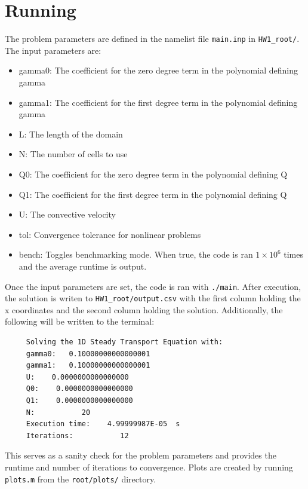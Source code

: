 \documentclass[reqno, 12pt]{article}
\begin{document}
    \section*{Running}
    The problem parameters are defined in the namelist file \texttt{main.inp} in \texttt{HW1\_root/}.
    The input parameters are:
    \begin{itemize}
        \setlength\itemsep{-0.25em}
        \item gamma0: The coefficient for the zero degree term in the polynomial defining gamma
        \item gamma1: The coefficient for the first degree term in the polynomial defining gamma
        \item L: The length of the domain
        \item N: The number of cells to use
        \item Q0: The coefficient for the zero degree term in the polynomial defining Q
        \item Q1: The coefficient for the first degree term in the polynomial defining Q
        \item U: The convective velocity
        \item tol: Convergence tolerance for nonlinear problems
        \item bench: Toggles benchmarking mode. When true, the code is ran $1\times 10^6$ times and the average runtime is output.
    \end{itemize}
    Once the input parameters are set, the code is ran with \texttt{./main}.
    After execution, the solution is writen to \texttt{HW1\_root/output.csv} with the first column holding the x coordinates and the second column holding the solution.
    Additionally, the following will be written to the terminal:
    \begin{verbatim}
     Solving the 1D Steady Transport Equation with:
     gamma0:   0.10000000000000001
     gamma1:   0.10000000000000001
     U:    0.0000000000000000
     Q0:    0.0000000000000000
     Q1:    0.0000000000000000
     N:           20
     Execution time:    4.99999987E-05  s
     Iterations:           12
    \end{verbatim}
    \vspace{-0.25in}
    This serves as a sanity check for the problem parameters and provides the runtime and number of iterations to convergence.
    Plots are created by running \texttt{plots.m} from the \texttt{root/plots/} directory.
    \newpage
\end{document}
